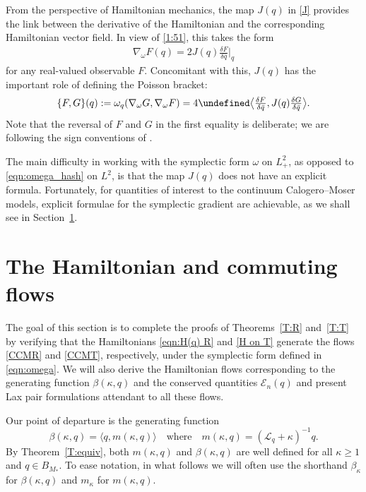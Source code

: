 \documentclass{amsart}
\numberwithin{equation}{section}
\theoremstyle{definition}
\newcommand{\dl}{\delta}
\newcommand{\om}{\omega}
\newcommand{\ka}{\kappa}
\newcommand{\Lc}{\mathcal{L}}
\newcommand{\na}{\nabla}
\let\Re=\undefined\DeclareMathOperator{\Re}{Re}
\newcommand{\qtq}[1]{\quad\text{#1}\quad}
\begin{document}
From the perspective of Hamiltonian mechanics, the map $J(q)$ in \eqref{J} provides the link between the derivative of the Hamiltonian and the corresponding Hamiltonian vector field.  In view of \eqref{1:51}, this takes the form
\begin{align}\label{symplectic gradient}
\na_\om F(q)=2J(q) \tfrac{\dl F}{\dl \bar{q}}\bigr|_q
\end{align}
for any real-valued observable $F$.  Concomitant with this, $J(q)$ has the important role of defining the Poisson bracket:
\begin{equation}\label{PBJ}
\{F, G\} (q) := \omega_q( \nabla_\omega G,  \nabla_\omega F ) = 4 \Re \big\langle \tfrac{\dl F}{\dl \bar{q}}, J(q) \tfrac{\dl G}{\dl \bar{q}}  \bigr\rangle.
\end{equation}
Note that the reversal of $F$ and $G$ in the first equality is deliberate; we are following the sign conventions of \cite{MR2269239}.

The main difficulty in working with the symplectic form $\om$ on $L^2_+$, as opposed to \eqref{eqn:omega_hash} on $L^2$, is that the map $J(q)$ does not have an explicit formula. Fortunately, for quantities of interest to the continuum Calogero--Moser models, explicit formulae for the symplectic gradient are achievable, as we shall see in Section~\ref{sec:flows}.

\section{The Hamiltonian and commuting flows}\label{sec:flows}

The goal of this section is to complete the proofs of Theorems~\ref{T:R} and~\ref{T:T} by verifying that the Hamiltonians \eqref{eqn:H(q) R} and \eqref{H on T} generate the flows \eqref{CCMR} and \eqref{CCMT}, respectively, under the symplectic form defined in \eqref{eqn:omega}.  We will also derive the Hamiltonian flows corresponding to the generating function $\beta(\kappa, q)$ and the conserved quantities $\mathcal{E}_n(q)$ and present Lax pair formulations attendant to all these flows.

Our point of departure is the generating function
$$
\beta(\kappa,q) = \langle q, m(\ka,q)\rangle \qtq{where} m(\ka,q) = (\Lc_q  +\kappa)^{-1} q.
$$
By Theorem~\ref{T:equiv}, both $m(\ka,q)$ and $\beta(\ka,q)$ are well defined for all $\kappa\geq 1$ and $q\in B_{M_*}$. To ease notation, in what follows we will often use the shorthand $\beta_\ka$ for $\beta(\kappa,q)$ and $m_\ka$ for $m(\ka,q)$.
\end{document}
